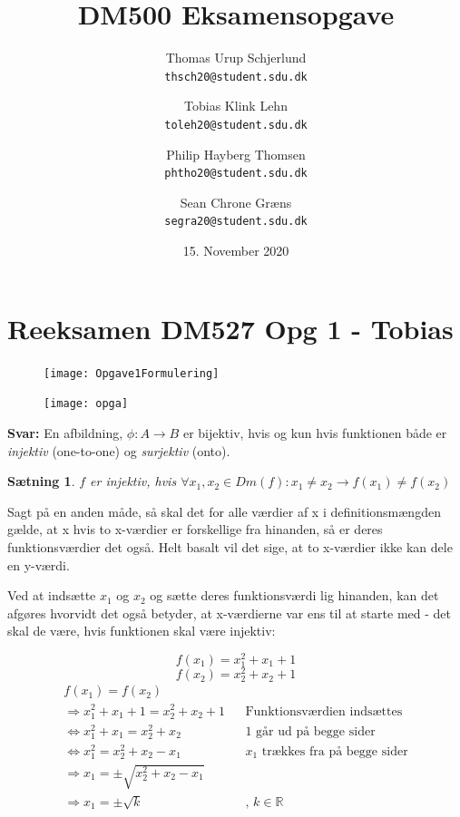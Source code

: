 \documentclass{article}
\title{DM500 Eksamensopgave}
\author{
	Thomas Urup Schjerlund\\
	\texttt{thsch20@student.sdu.dk}
	\and
	Tobias Klink Lehn\\
	\texttt{toleh20@student.sdu.dk}
	\and
	Philip Hayberg Thomsen\\
	\texttt{phtho20@student.sdu.dk}
	\and
	Sean Chrone Græns\\
	\texttt{segra20@student.sdu.dk}
}
\date{15. November 2020}
\newtheorem{theorem}{Sætning}
\begin{document}
\begin{titlepage}
\maketitle
\end{titlepage}

\section{Reeksamen DM527 Opg 1 - Tobias}
\begin{figure}[h]
\texttt{[image: Opgave1Formulering]}
\end{figure}

\begin{figure}[h]
\texttt{[image: opga]}
\end{figure}
\textbf{Svar:}
En afbildning, $\phi: A \rightarrow B$ er bijektiv, hvis og kun hvis funktionen både er \emph{injektiv} (one-to-one) og \emph{surjektiv} (onto).

\begin{theorem}
$f$ er injektiv, hvis $\forall x_1, x_2 \in Dm(f): x_1 \neq x_2 \rightarrow f(x_1) \neq f(x_2)$
\end{theorem}

Sagt på en anden måde, så skal det for alle værdier af x i definitionsmængden gælde, at x hvis to x-værdier er forskellige fra hinanden, så er deres funktionsværdier det også. Helt basalt vil det sige, at to x-værdier ikke kan dele en y-værdi.

Ved at indsætte $x_1$ og $x_2$ og sætte deres funktionsværdi lig hinanden, kan det afgøres hvorvidt det også betyder, at x-værdierne var ens til at starte med - det skal de være, hvis funktionen skal være injektiv:
\begin{center}
\[f(x_1) = x_1^2 + x_1 + 1 \] 
\[ f(x_2)=x_2^2 + x_2 + 1 \] 
\begin{align*}
f(x_1) = f(x_2) \\
\Rightarrow x^2_1 + x_1 + 1 = x^2_2 + x_2 + 1 && \text{Funktionsværdien indsættes} \\
\Leftrightarrow x^2_1 + x_1 = x^2_2 + x_2 && \text{1 går ud på begge sider} \\
\Leftrightarrow x_1^2 = x_2^2 + x_2 - x_1 && \text{$x_1$ trækkes fra på begge sider}\\
\Rightarrow x_1 = \pm\sqrt{x_2^2 + x_2 - x_1} \\
\Rightarrow x_1 = \pm\sqrt{k}  && \text{, $k \in \mathbb{R}$}
\end{align*}
\end{center}
\end{document}
